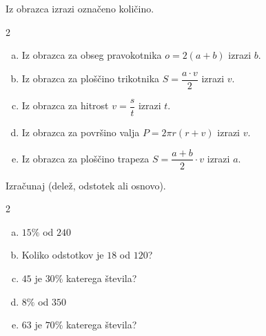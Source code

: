 \documentclass[a4paper,12pt]{letter}
\begin{document}
\begin{naloga}
Iz obrazca izrazi ozna\v{c}eno koli\v{c}ino.

\begin{multicols}{2}
\begin{enumerate}[a.)]
\item Iz obrazca za obseg pravokotnika $o=2(a+b)$ izrazi $b$.
\item Iz obrazca za plo\v{s}\v{c}ino trikotnika $S=\dfrac{a\cdot v}{2}$ izrazi $v$.
\item Iz obrazca za hitrost $v=\dfrac{s}{t}$ izrazi $t$.
\item Iz obrazca za povr\v{s}ino valja $P=2\pi r(r+v)$ izrazi $v$.
\item Iz obrazca za plo\v{s}\v{c}ino trapeza $S=\dfrac{a+b}{2}\cdot v$ izrazi $a$.
\end{enumerate}
\end{multicols}
\end{naloga}

\begin{naloga}
Izra\v{c}unaj (dele\v{z}, odstotek ali osnovo).

\begin{multicols}{2}
\begin{enumerate}[a.)]
\item $15\%$ od $240$
\item Koliko odstotkov je $18$ od $120$?
\item $45$ je $30\%$ katerega \v{s}tevila?
\item $8\%$ od $350$
\item $63$ je $70\%$ katerega \v{s}tevila?
\end{enumerate}
\end{multicols}
\end{naloga}
\end{document}
